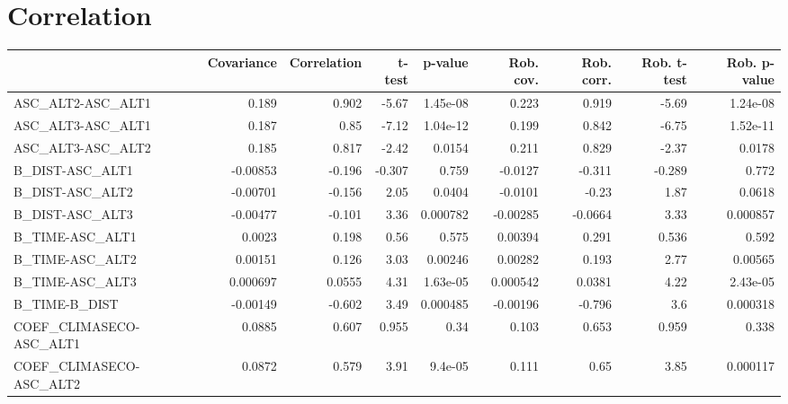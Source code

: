 \section{Correlation}
\begin{tabular}{lrrrrrrrr}
\toprule
{} &  Covariance &  Correlation &  t-test &  p-value &  Rob. cov. &  Rob. corr. &  Rob. t-test &  Rob. p-value \\
\midrule
ASC\_ALT2-ASC\_ALT1              &       0.189 &        0.902 &   -5.67 & 1.45e-08 &      0.223 &       0.919 &        -5.69 &      1.24e-08 \\
ASC\_ALT3-ASC\_ALT1              &       0.187 &         0.85 &   -7.12 & 1.04e-12 &      0.199 &       0.842 &        -6.75 &      1.52e-11 \\
ASC\_ALT3-ASC\_ALT2              &       0.185 &        0.817 &   -2.42 &   0.0154 &      0.211 &       0.829 &        -2.37 &        0.0178 \\
B\_DIST-ASC\_ALT1                &    -0.00853 &       -0.196 &  -0.307 &    0.759 &    -0.0127 &      -0.311 &       -0.289 &         0.772 \\
B\_DIST-ASC\_ALT2                &    -0.00701 &       -0.156 &    2.05 &   0.0404 &    -0.0101 &       -0.23 &         1.87 &        0.0618 \\
B\_DIST-ASC\_ALT3                &    -0.00477 &       -0.101 &    3.36 & 0.000782 &   -0.00285 &     -0.0664 &         3.33 &      0.000857 \\
B\_TIME-ASC\_ALT1                &      0.0023 &        0.198 &    0.56 &    0.575 &    0.00394 &       0.291 &        0.536 &         0.592 \\
B\_TIME-ASC\_ALT2                &     0.00151 &        0.126 &    3.03 &  0.00246 &    0.00282 &       0.193 &         2.77 &       0.00565 \\
B\_TIME-ASC\_ALT3                &    0.000697 &       0.0555 &    4.31 & 1.63e-05 &   0.000542 &      0.0381 &         4.22 &      2.43e-05 \\
B\_TIME-B\_DIST                  &    -0.00149 &       -0.602 &    3.49 & 0.000485 &   -0.00196 &      -0.796 &          3.6 &      0.000318 \\
COEF\_CLIMASECO-ASC\_ALT1        &      0.0885 &        0.607 &   0.955 &     0.34 &      0.103 &       0.653 &        0.959 &         0.338 \\
COEF\_CLIMASECO-ASC\_ALT2        &      0.0872 &        0.579 &    3.91 &  9.4e-05 &      0.111 &        0.65 &         3.85 &      0.000117 \\

\end{tabular}
